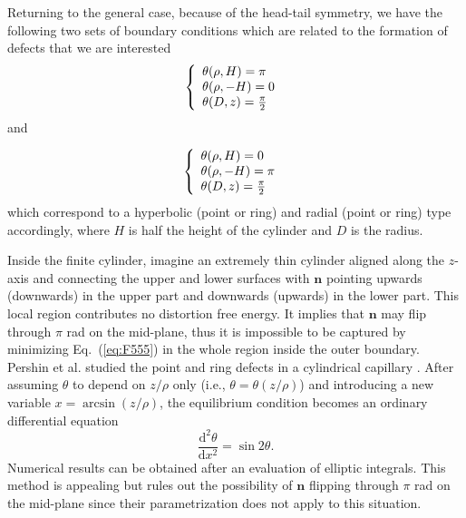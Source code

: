 \documentclass[nottitlepage]{article}
\begin{document}
Returning to the general case, because of the head-tail symmetry, we have the following two sets of boundary conditions which are related to the formation of defects that we are interested
           \begin{equation}\label{eq:theta2}
           \left\{
           \begin{array}{l l l l}

           \theta(\rho,H)=\pi\\
           \theta(\rho,-H)=0 \\
           \theta(D,z)=\frac{\pi}{2}\\
           \end{array}
           \right.\
           \end{equation}
           and

           \begin{equation}\label{eq:theta3}
                 \left\{
                 \begin{array}{l l l l}

                 \theta(\rho,H)=0\\
                 \theta(\rho,-H)=\pi \\
                 \theta(D,z)=\frac{\pi}{2}\\
                 \end{array}
                 \right.\
                 \end{equation}
    which correspond to a hyperbolic (point or ring) and radial (point or ring) type accordingly, where $H$ is half the height of the cylinder and $D$ is the radius. 

    Inside the finite cylinder, imagine an extremely thin cylinder aligned along the $z$-axis and connecting the upper and lower surfaces with $\mathbf{n}$ pointing upwards (downwards) in the upper part and downwards (upwards) in the lower part. This local region contributes no distortion free energy. It implies that $\mathbf{n}$ may flip through $\pi$ rad on the mid-plane, thus it is impossible to be captured by minimizing Eq.~(\ref{eq:F555}) in the whole region inside the outer boundary. Pershin et al. studied the point and ring defects in a cylindrical capillary \cite{pershin}. After assuming $\theta $  to depend on $z/\rho$ only (i.e., $\theta=\theta(z/\rho)$) and introducing a new variable $x=\arcsin (z/\rho)$,  the equilibrium condition becomes an ordinary differential equation
         \begin{equation}\label{eq:theta4}
         \frac{\mathrm{d}^2\theta}{\mathrm{d}x^2}=\sin 2\theta.
          \end{equation}
          Numerical results can be obtained after an evaluation of elliptic integrals. This method is appealing but rules out the possibility of $\mathbf{n}$ flipping through $\pi$ rad on the mid-plane since their parametrization does not apply to this situation.
\end{document}

